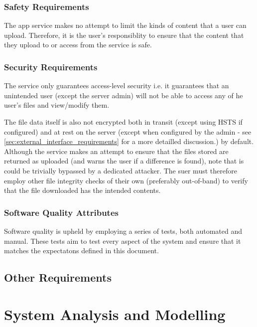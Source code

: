 \documentclass[12pt,a4paper]{report}
\begin{document}
\subsection{Safety Requirements}
The app service makes no attempt to limit the kinds of content that a user can upload.
Therefore, it is the user's responsiblity to ensure that the content that they upload to or access from the service is safe.
\subsection{Security Requirements}
The service only guarantees access-level security i.e. it guarantees that an unintended user (except the server admin) will not be able to access any of he user's files and view/modify them.

The file data itself is also not encrypted both in transit (except using HSTS if configured) and at rest on the server (except when configured by the admin - see \ref{sec:external_interface_requirements} for a more detailled discussion.) by default.
Although the service makes an attempt to ensure that the files stored are returned as uploaded (and warns the user if a difference is found), note that is could be trivially bypassed by a dedicated attacker.
The suer must therefore employ other file integrity checks of their own (preferably out-of-band) to verify that the file downloaded has the intended contents.
\subsection{Software Quality Attributes}
Software quality is upheld by employing a series of tests, both automated and manual.
These tests aim to test every aspect of the system and ensure that it matches the expectatons defined in this document.
\section{Other Requirements}
\newpage
\chapter{System Analysis and Modelling}\label{cha:system_analysis_and_modelling}
\end{document}
